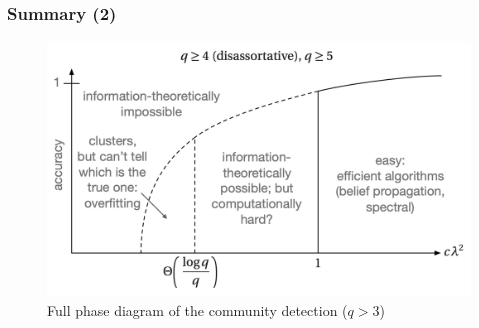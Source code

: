\documentclass[dvipdfmx,11pt]{beamer}
\begin{document}
\begin{frame}
  \frametitle{Summary (2)}
  \begin{figure}
    \centering
    \includegraphics[width=0.9\linewidth]{figure/phase_s2.png}
    \caption{Full phase diagram of the community detection ($q > 3$)}
  \end{figure}
\end{frame}
\end{document}
